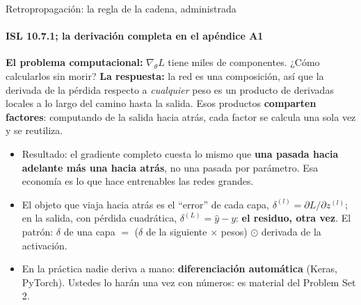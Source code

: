 \documentclass{beamer}
\newcommand{\1}{\mathbb{I}}
\begin{document}
\begin{frame}{Retropropagación: la regla de la cadena, administrada}
\framesubtitle{ISL 10.7.1; la derivación completa en el apéndice A1}
\small
\textbf{El problema computacional:} $\nabla_\theta L$ tiene miles de componentes. ¿Cómo calcularlos sin morir?
\pause
\vspace{0.1cm}
\textbf{La respuesta:} la red es una composición, así que la derivada de la pérdida respecto a \emph{cualquier} peso es un producto de derivadas locales a lo largo del camino hasta la salida. Esos productos \textbf{comparten factores}: computando de la salida hacia atrás, cada factor se calcula una sola vez y se reutiliza.
\pause
\begin{itemize}\itemsep3pt
  \item Resultado: el gradiente completo cuesta lo mismo que \textbf{una pasada hacia adelante más una hacia atrás}, no una pasada por parámetro. Esa economía es lo que hace entrenables las redes grandes.
  \item El objeto que viaja hacia atrás es el ``error'' de cada capa, $\delta^{(l)} = \partial L / \partial z^{(l)}$; en la salida, con pérdida cuadrática, $\delta^{(L)} = \hat{y} - y$: \textbf{el residuo, otra vez}. El patrón: $\delta$ de una capa $=$ ($\delta$ de la siguiente $\times$ pesos) $\odot$ derivada de la activación.
  \item En la práctica nadie deriva a mano: \textbf{diferenciación automática} (Keras, PyTorch). Ustedes lo harán una vez con números: es material del Problem Set 2.
\end{itemize}
\end{frame}
\end{document}

